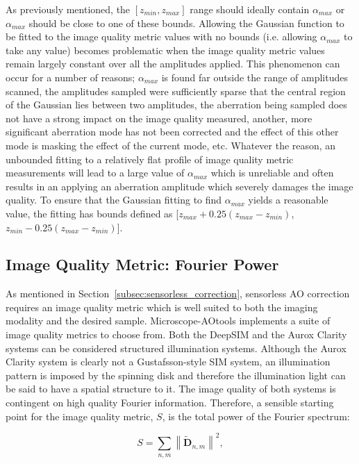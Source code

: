 As previously mentioned, the $[z_{min},z_{max}]$ range should ideally
contain $\alpha_{max}$ or $\alpha_{max}$ should be close to one of these
bounds. Allowing the Gaussian function to be fitted to the image
quality metric values with no bounds (i.e. allowing $\alpha_{max}$ to take
any value) becomes problematic when the image quality metric values
remain largely constant over all the amplitudes applied. This
phenomenon can occur for a number of reasons; $\alpha_{max}$ is found far
outside the range of amplitudes scanned, the amplitudes sampled were
sufficiently sparse that the central region of the Gaussian lies
between two amplitudes, the aberration being sampled does not have a
strong impact on the image quality measured, another, more significant
aberration mode has not been corrected and the effect of this other
mode is masking the effect of the current mode, etc. Whatever the
reason, an unbounded fitting to a relatively flat profile of image
quality metric measurements will lead to a large value of $\alpha_{max}$
which is unreliable and often results in an applying an aberration
amplitude which severely damages the image quality. To ensure that the
Gaussian fitting to find $\alpha_{max}$ yields a reasonable value, the
fitting has bounds defined as [$z_{max} + 0.25(z_{max}-z_{min})$, $z_{min} - 0.25(z_{max}-z_{min})$].

\subsection{Image Quality Metric: Fourier Power}
\label{subsec:fourier_power_metric}


As mentioned in Section~\ref{subsec:sensorless_correction}, sensorless AO 
correction requires an image quality metric which is well suited to both the 
imaging modality and the desired sample. Microscope-AOtools implements a 
suite of image quality metrics to choose from. Both the DeepSIM and the Aurox 
Clarity systems can be considered structured illumination systems. Although 
the Aurox Clarity system is clearly not a Gustafsson-style SIM system, an 
illumination pattern is imposed by the spinning disk and therefore the 
illumination light can be said to have a spatial structure to it. The image 
quality of both systems is contingent on high quality Fourier information. 
Therefore, a sensible starting point for the image quality metric, $S$, is 
the total power of the Fourier spectrum:

\begin{equation}\label{eq:fourier_power_spectrum}
S = \sum\limits_{n,m}{\left\| \tilde{\textbf{D}}_{n,m} \right\|^2},
\end{equation}

